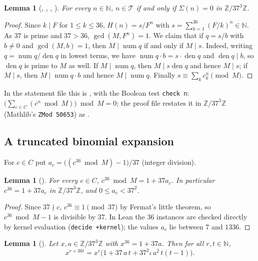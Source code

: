\documentclass[11pt]{amsart}
\theoremstyle{plain}
\newtheorem{lemma}[theorem]{Lemma}
\theoremstyle{definition}
\newcommand{\code}[1]{\texttt{#1}}
\newcommand{\N}{\mathbb{N}}
\newcommand{\Z}{\mathbb{Z}}
\newcommand{\Term}{\mathcal{T}}
\newcommand{\Zm}{\Z/37^3\Z}
\DeclareMathOperator{\num}{num}
\begin{document}
\begin{lemma}[, , , ]\label{lem:reduce}
For every $n\in\N$, $n\in\Term$ if and only if $\Sigma(n)=0$ in $\Zm$.
\end{lemma}

\begin{proof}
Since $k\mid F$ for $1\le k\le 36$, $H(n)=s/F^n$ with $s=\sum_{k=1}^{36}(F/k)^n\in\N$. As $37$ is prime and $37>36$, $\gcd(M,F^n)=1$. We claim that if $q=s/b$ with $b\ne0$ and $\gcd(M,b)=1$, then $M\mid\num q$ if and only if $M\mid s$. Indeed, writing $q=\num q/\operatorname{den}q$ in lowest terms, we have $\num q\cdot b=s\cdot\operatorname{den}q$ and $\operatorname{den}q\mid b$, so $\operatorname{den}q$ is prime to $M$ as well. If $M\mid\num q$, then $M\mid s\operatorname{den}q$ and hence $M\mid s$; if $M\mid s$, then $M\mid \num q\cdot b$ and hence $M\mid\num q$. Finally $s\equiv\sum_k c_k^n\pmod M$.
\end{proof}

In the statement file this is , with the Boolean test \code{check n}: $\bigl(\sum_{c\in C}(c^n\bmod M)\bigr)\bmod M=0$; the proof file restates it in $\Zm$ (Mathlib's \code{ZMod 50653}) as .

\subsection{A truncated binomial expansion}
For $c\in C$ put $a_c=\bigl((c^{36}\bmod M)-1\bigr)/37$ (integer division).

\begin{lemma}[]\label{lem:fermat}
For every $c\in C$, $c^{36}\bmod M=1+37a_c$. In particular $c^{36}=1+37a_c$ in $\Zm$, and $0\le a_c<37^2$.
\end{lemma}

\begin{proof}
Since $37\nmid c$, $c^{36}\equiv1\pmod{37}$ by Fermat's little theorem, so $c^{36}\bmod M-1$ is divisible by $37$. In Lean the $36$ instances are checked directly by kernel evaluation (\texttt{decide +kernel}); the values $a_c$ lie between $7$ and $1336$.
\end{proof}

\begin{lemma}[]\label{lem:binom}
Let $x,a\in\Zm$ with $x^{36}=1+37a$. Then for all $r,t\in\N$,
\[
  x^{r+36t}=x^r\bigl(1+37\,a\,t+37^2\iota\,a^2\,t(t-1)\bigr).
\]
\end{lemma}
\end{document}
